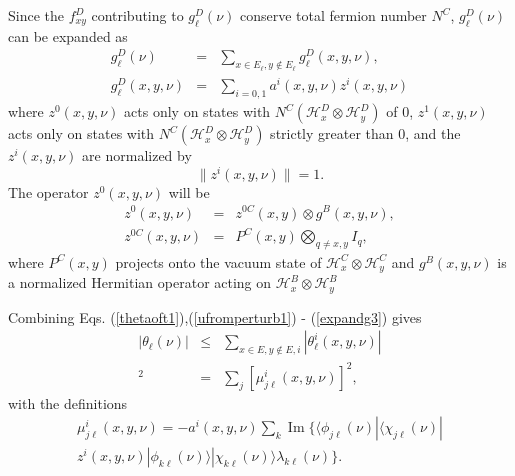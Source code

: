 \documentclass[twocolumn,amsmath,amssymb]{revtex4-1}
\begin{document}
Since the $f^D_{xy}$ contributing to $g^D_\ell(\nu)$
conserve total fermion number $N^C$,
$g^D_\ell(\nu)$ can be expanded as
\begin{subequations}
\begin{eqnarray}
\label{expandg2}
g^D_{\ell}(\nu) &=& \sum_{x \in E_\ell, y \notin E_\ell} g^D_{\ell}( x, y, \nu),\\
\label{expandg3}
g^D_{\ell}(x,y,\nu) &=& \sum_{i = 0,1} a^i(x, y, \nu) z^i(x, y, \nu)
\end{eqnarray}
\end{subequations}
where $z^0( x, y, \nu)$ acts only on states
with $N^C( \mathcal{H}^D_x \otimes \mathcal{H}^D_y)$ of 0,
$z^1( x, y, \nu)$ acts only on states
with $N^C( \mathcal{H}^D_x \otimes \mathcal{H}^D_y)$ strictly greater than 0,
and the $z^i(x,y,\nu)$ are normalized by 
\begin{equation}
\label{normzi1}
\parallel z^i(x, y, \nu) \parallel   =  1.
\end{equation}
The operator
$z^0(x, y, \nu)$ will be
\begin{subequations}
\begin{eqnarray}
\label{zprojection1}
z^0(x,y,\nu) &=& z^{0C}(x,y) \otimes g^B(x,y,\nu), \\
z^{0C}(x,y,\nu) &=& P^C(x,y) \bigotimes_{q \ne x,y} I_q,
\end{eqnarray}
\end{subequations}
where $P^C(x,y)$ projects onto the vacuum state
of $\mathcal{H}^C_x \otimes \mathcal{H}^C_y$
and $g^B(x,y,\nu)$ is a normalized Hermitian
operator acting on $\mathcal{H}^B_x \otimes \mathcal{H}^B_y$

Combining Eqs. (\ref{thetaoft1}),(\ref{ufromperturb1}) - (\ref{expandg3}) gives
\begin{subequations}
\begin{eqnarray}
\label{thetasum1}
|\theta_\ell(\nu)| &\le& \sum_{x \in E, y \notin E, i}|\theta^i_{\ell}(x,y,\nu)|\\ 
\label{defthetai1}
[\theta^i_{\ell}( x,y,\nu)]^2 & = & \sum_j [ \mu^i_{j\ell}(x,y,\nu)]^2,
\end{eqnarray}
\end{subequations}
with the definitions
\begin{multline}
\label{musupi1}
\mu^i_{j\ell}(x,y,\nu) =  -a^i(x,y,\nu) \sum_k \operatorname{Im}\{ 
 \langle \phi_{j\ell}(\nu)| \langle \chi_{j\ell}(\nu)| \\
z^i(x,y,\nu)|\phi_{k\ell}(\nu) \rangle |\chi_{k\ell}(\nu) \rangle  \lambda_{k\ell}(\nu)\}.
\end{multline}
\end{document}
